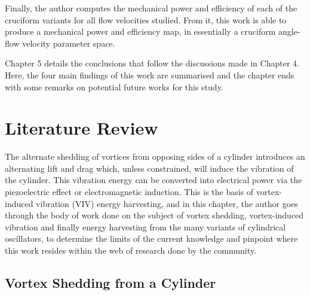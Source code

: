 \documentclass[oneside]{utmthesis}
\begin{document}
Finally, the author computes the mechanical power and efficiency of each of the cruciform variants for all flow velocities studied. From it, this work is able to produce a mechanical power and efficiency map, in essentially a cruciform angle-flow velocity parameter space.

Chapter 5 details the conclusions that follow the discussions made in Chapter 4. Here, the four main findings of this work are summarised and the chapter ends with some remarks on potential future works for this study.

\chapter{Literature Review} \label{chap:literatureReview}
The alternate shedding of vortices from opposing sides of a cylinder introduces an alternating lift and drag which, unless constrained, will induce the vibration of the cylinder. This vibration energy can be converted into electrical power via the piezoelectric effect or electromagnetic induction. This is the basis of vortex-induced vibration (VIV) energy harvesting, and in this chapter, the author goes through the body of work done on the subject of vortex shedding, vortex-induced vibration and finally energy harvesting from the many variants of cylindrical oscillators, to determine the limits of the current knowledge and pinpoint where this work resides within the web of research done by the community.

\section{Vortex Shedding from a Cylinder}
\end{document}
